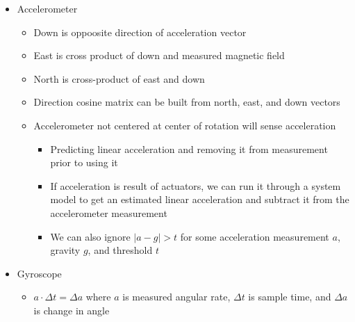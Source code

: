 \documentclass{article}
\begin{document}
\begin{itemize}
\begin{itemize}
\begin{itemize}
            \begin{itemize}
                \item Distort measurement as an oval
            \end{itemize}
        \end{itemize}
        \item Magnetometer calibration
        \begin{itemize}
            \item Measuring across $4 \pi$ steradian directions, we would find perfect sphere in perfect system with radius being magnitude of sphere
            \item By measuring the distortions, we can find a correction by $x_{corrected} = (x - b) \cdot A$ where $b$ is the hard iron bias ($3 \times 1$ vector) and $A$ is the soft iron distortion ($3 \times 3$ matrix)
        \end{itemize}
    \end{itemize}
    \item Accelerometer
    \begin{itemize}
        \item Down is oppoosite direction of acceleration vector 
        \item East is cross product of down and measured magnetic field
        \item North is cross-product of east and down
        \item Direction cosine matrix can be built from north, east, and down vectors
        \item Accelerometer not centered at center of rotation will sense acceleration
        \begin{itemize}
            \item Predicting linear acceleration and removing it from measurement prior to using it
            \item If acceleration is result of actuators, we can run it through a system model to get an estimated linear acceleration and subtract it from the accelerometer measurement
            \item We can also ignore $\vert a - g \vert > t$ for some acceleration measurement $a$, gravity $g$, and threshold $t$
        \end{itemize}
    \end{itemize}
    \item Gyroscope
    \begin{itemize}
        \item $a \cdot \Delta t = \Delta a$ where $a$ is measured angular rate, $\Delta t$ is sample time, and $\Delta a$ is change in angle

\end{itemize}
\end{itemize}
\end{document}
